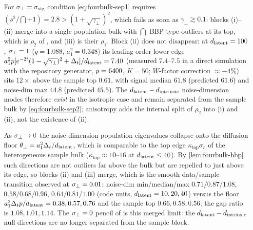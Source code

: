 \begin{remark}\label{rem:fourbulk-isotropic}
For $\sigma_{\perp}=\sigma_{\mathrm{sig}}$ condition \eqref{eq:fourbulk-sep1} requires $(s^2/\dint+1)=2.8>(1+\sqrt{\gamma_\perp})^2$, which fails as soon as $\gamma_\perp\gtrsim0.1$: blocks (i)--(ii) merge into a single population bulk with $\dint$ BBP-type outliers at its top, which is $\rho_2$ of \citet{bonnaire2025}, and (iii) is their $\rho_1$. Block (ii) does not disappear: at $d_{\mathrm{latent}}=100$, $\sigma_{\perp}=1$ ($q=1.088$, $a_1^2=0.348$) its leading-order lower edge $a_1^2p[e^{-2t}(1-\sqrt{\gamma_\perp})^2+\Delta_t]/d_{\mathrm{latent}}=7.40$ (measured $7.4$--$7.5$ in a direct simulation with the repository generator, $p=6400$, $K=50$; $W$-factor correction $\approx-4\%$) sits $12\times$ above the sample top $0.61$, with signal median $61.8$ (predicted $61.6$) and noise-dim max $44.8$ (predicted $45.5$). The $d_{\mathrm{latent}}-d_{\mathrm{intrinsic}}$ noise-dimension modes therefore \emph{exist} in the isotropic case and remain separated from the sample bulk by \eqref{eq:fourbulk-sep2}; anisotropy adds the internal split of $\rho_2$ into (i) and (ii), not the existence of (ii).
\end{remark}

\begin{remark}\label{rem:fourbulk-sigperp0}
As $\sigma_{\perp}\to0$ the noise-dimension population eigenvalues collapse onto the diffusion floor $\theta_\perp=a_1^2\Delta_t/d_{\mathrm{latent}}$, which is comparable to the top edge $\kappa_{\mathrm{top}}\sigma_r$ of the heterogeneous sample bulk ($\kappa_{\mathrm{top}}\approx10$--$16$ at $d_{\mathrm{latent}}\le40$). By \cref{lem:fourbulk-bbp} such directions are not outliers far above the bulk but are repelled to just above its edge, so blocks (ii) and (iii) merge, which is the smooth data/sample transition observed at $\sigma_{\perp}=0.01$: noise-dim min/median/max $0.71/0.87/1.08$, $0.58/0.68/0.96$, $0.64/0.81/1.00$ (code units, $d_{\mathrm{latent}}=10,20,40$) versus the floor $a_1^2\Delta_tp/d_{\mathrm{latent}}=0.38,0.57,0.76$ and the sample top $0.66,0.58,0.56$; the gap ratio is $1.08,1.01,1.14$. The $\sigma_{\perp}=0$ pencil of \citet{george2025dsm} is this merged limit: the $d_{\mathrm{latent}}-d_{\mathrm{intrinsic}}$ null directions are no longer separated from the sample block.
\end{remark}

